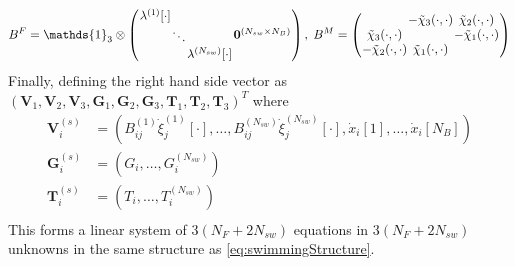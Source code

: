 \begin{equation*}
\arraycolsep=0.4pt\def\arraystretch{1}
    B^F = \mathds{1}_{3} \otimes \left(\begin{array}{cc}
         \begin{array}{ccc}
             \lambda^{(1)}[\cdot] & & \\
              & \ddots & \\
              & & \lambda^{(N_{sw})}[\cdot]
         \end{array} & \bm{0}^{(N_{sw} \times N_B)}
    \end{array}\right), \;
    B^M =
    \left(\begin{array}{ccc}
             & -\tilde{\chi}_3(\cdot,\cdot) & \tilde{\chi}_2(\cdot,\cdot)\\
            \tilde{\chi}_3(\cdot,\cdot) & & -\tilde{\chi}_1(\cdot,\cdot)\\
            -\tilde{\chi}_2(\cdot,\cdot) & \tilde{\chi}_1(\cdot,\cdot) &
          \end{array}\right)
\end{equation*}
Finally, defining the right hand side vector as $(\bm{V}_1,\bm{V}_2,\bm{V}_3,\bm{G}_1,\bm{G}_2,\bm{G}_3,\bm{T}_1,\bm{T}_2,\bm{T}_3)^T$ where
\begin{equation*}
\begin{aligned}
        \bm{V}_i^{(s)} &= (B_{ij}^{(1)}\dot{\xi}_j^{(1)}[\cdot],\dots,B_{ij}^{(N_{sw})}\dot{\xi}_j^{(N_{sw})}[\cdot],\dot{x}_i[1],\dots,\dot{x}_i[N_B]) \\
        \bm{G}_i^{(s)} &= (G_i,\dots,G_i^{(N_{sw})}) \\
        \bm{T}_i^{(s)} &= (T_i,\dots,T_i^{(N_{sw})}) \\
\end{aligned}
\end{equation*}
This forms a linear system of $3(N_F+2N_{sw})$ equations in $3(N_F+2N_{sw})$ unknowns in the same structure as \cref{eq:swimmingStructure}.


